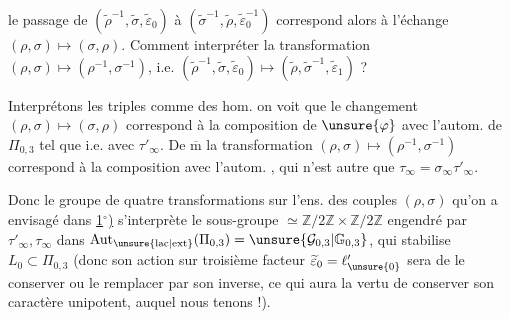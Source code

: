 


le passage de $(\widetilde\rho^{-1},\widetilde\sigma,\widetilde\varepsilon_0)$ à $(\widetilde\sigma^{-1},\widetilde\rho,\widetilde\varepsilon_0^{-1})$ correspond alors à l'échange $(\rho,\sigma)\mapsto(\sigma,\rho)$. Comment  interpréter la transformation $(\rho,\sigma)\mapsto(\rho^{-1},\sigma^{-1})$, i.e. $(\widetilde\rho^{-1},\widetilde\sigma,\widetilde\varepsilon_0)\mapsto(\widetilde\rho,\widetilde\sigma^{-1},\widetilde\varepsilon_1)$ ?

Interprétons les triples comme des hom.
on voit que le changement $(\rho,\sigma)\mapsto(\sigma,\rho)$ correspond à la composition de $\unsure{\varphi}$ avec l'autom. de $\Pi_{0,3}$ tel que
i.e. avec \uline{$\tau'_\infty$}. De $\overline{\mathrm m}$ la transformation $(\rho,\sigma)\mapsto(\rho^{-1},\sigma^{-1})$ correspond à la composition avec l'autom.
,
qui n'est autre que \uline{$\tau_\infty$}$=\sigma_\infty\tau'_\infty$.

Donc le groupe de quatre transformations  sur l'ens. des couples $(\rho,\sigma)$ qu'on a envisagé dans \uline{1$^\circ$)} s'interprète   le sous-groupe $\simeq\mathbb Z/2\mathbb Z\times\mathbb Z/2\mathbb Z$ engendré par $\tau'_\infty,\tau_\infty$ dans $\operatorname{Aut}_{\unsure{\mathrm{lac}|\mathrm{ext}}}(\Pi_{0,3})=\unsure{\mathcal G_{0,3}|\mathbb G_{0,3}}$, qui  stabilise $L_0\subset\Pi_{0,3}$ (donc son action sur  troisième facteur $\widetilde\varepsilon_0=\ell'_{\unsure{0}}$ sera de le conserver ou le remplacer par son inverse,  ce qui aura la vertu de  conserver son caractère unipotent, auquel nous tenons !).

